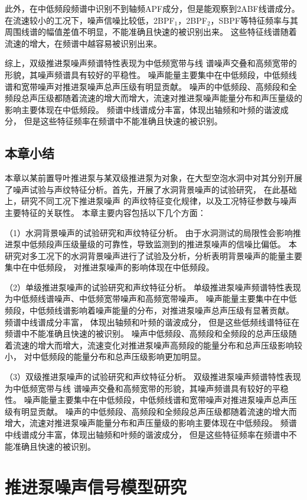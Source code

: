 此外，在中低频段频谱中识别不到轴频APF成分，但是能观察到2ABF线谱成分。
在流速较小的工况下，噪声信噪比较低，2BPF$_1$，2BPF$_2$，SBPF等特征频率与其周围线谱的幅值差值不明显，不能准确且快速的被识别出来。
这些特征线谱随着流速的增大，在频谱中越容易被识别出来。

综上，双级推进泵噪声频谱特性表现为中低频宽带与线
谱噪声交叠和高频宽带的形貌，其噪声频谱具有较好的平稳性。
噪声能量主要集中在中低频段，中低频线谱和宽带噪声对推进泵噪声总声压级有明显贡献。
噪声的中低频段、高频段和全频段总声压级都随着流速的增大而增大，流速对推进泵噪声能量分布和声压量级的影响主要体现在中低频段。
频谱中线谱成分丰富，体现出轴频和叶频的谐波成分，
但是这些特征频率在频谱中不能准确且快速的被识别。

\section{本章小结}
本章以某前置导叶推进泵与某双级推进泵为对象，在大型空泡水洞中对其分别开展
了噪声试验与声纹特征分析。首先，开展了水洞背景噪声的试验研究，
在此基础上，研究不同工况下推进泵噪声
的声纹特征变化规律，以及工况特征参数与噪声主要特征的关联性。
本章主要内容包括以下几个方面：

（1）水洞背景噪声的试验研究和声纹特征分析。
由于水洞测试的局限性会影响推进泵中低频段声压级量级的可靠性，导致监测到的推进泵噪声的信噪比偏低。
本研究对多工况下的水洞背景噪声进行了试验及分析，分析表明背景噪声的能量主要集中在中低频段，
对推进泵噪声的影响体现在中低频段。

（2）单级推进泵噪声的试验研究和声纹特征分析。
单级推进泵噪声频谱特性表现为中低频线谱噪声、中低频宽带噪声和高频宽带噪声。
噪声能量主要集中在中低频段，中低频线谱影响着噪声能量的分布，对推进泵噪声总声压级有显著贡献。
频谱中线谱成分丰富，
体现出轴频和叶频的谐波成分，
但是这些低频线谱特征在频谱中不能准确且快速的被识别。
噪声中低频段、高频段和全频段的总声压级随着流速的增大而增大，流速变化对推进泵噪声高频段的能量分布和总声压级影响较小，
对中低频段的能量分布和总声压级影响更加明显。

（3）双级推进泵噪声的试验研究和声纹特征分析。
双级推进泵噪声频谱特性表现为中低频宽带与线
谱噪声交叠和高频宽带的形貌，其噪声频谱具有较好的平稳性。
噪声能量主要集中在中低频段，中低频线谱和宽带噪声对推进泵噪声总声压级有明显贡献。
噪声的中低频段、高频段和全频段总声压级都随着流速的增大而增大，流速对推进泵噪声能量分布和声压量级的影响主要体现在中低频段。
频谱中线谱成分丰富，体现出轴频和叶频的谐波成分，
但是这些特征频率在频谱中不能准确且快速的被识别。

\chapter{推进泵噪声信号模型研究}
